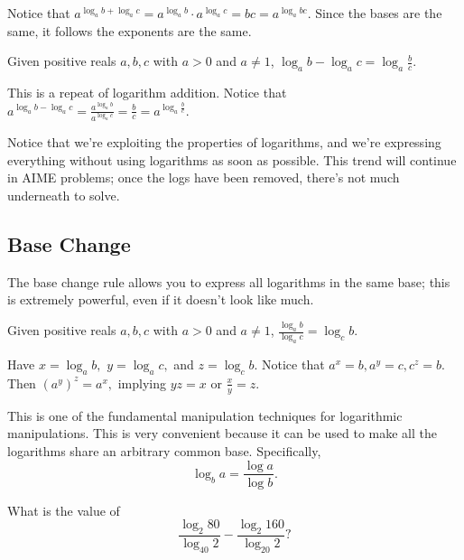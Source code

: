 \begin{pro}
Notice that $a^{\log_ab+\log_ac}=a^{\log_ab}\cdot a^{\log_ac}=bc=a^{\log_abc}.$ Since the bases are the same, it follows the exponents are the same.
\end{pro}

\begin{theo}
Given positive reals $a,b,c$ with $a > 0$ and $a \neq 1$, $\log_{a}b-\log_{a}c=\log_{a}{\frac{b}{c}}.$
\end{theo}

\begin{pro}
This is a repeat of logarithm addition. Notice that $a^{\log_ab-\log_ac}=\frac{a^{\log_ab}}{ a^{\log_ac}}=\frac{b}{c}=a^{\log_a\frac{b}{c}}.$
\end{pro}

Notice that we're exploiting the properties of logarithms, and we're expressing everything without using logarithms as soon as possible. This trend will continue in AIME problems; once the logs have been removed, there's not much underneath to solve.

\subsection{Base Change}
The base change rule allows you to express all logarithms in the same base; this is extremely powerful, even if it doesn't look like much.

\begin{theo}
Given positive reals $a,b,c$ with $a > 0$ and $a \neq 1$, $\frac{\log_{a}b}{\log_{a}c}=\log_{c}b.$
\end{theo}

\begin{pro}
Have $x=\log_ab,$ $y=\log_ac,$ and $z=\log_cb.$ Notice that $a^x=b,a^y=c,c^z=b.$ Then $(a^y)^z=a^x,$ implying $yz=x$ or $\frac{x}{y}=z.$
\end{pro}

This is one of the fundamental manipulation techniques for logarithmic manipulations. This is very convenient because it can be used to make all the logarithms share an arbitrary common base. Specifically,
\[\log_ba=\frac{\log a}{\log b}.\]

\begin{exam}[AMC 12B 2021/9]
What is the value of \[\frac{\log_2 80}{\log_{40}2}-\frac{\log_2 160}{\log_{20}2}?\]
\end{exam}

